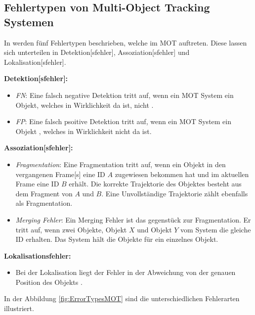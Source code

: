 \subsection{Fehlertypen von Multi-Object Tracking Systemen} \label{sec:MOT Fehlertypen}
In \cite{Leichter.2013} werden fünf Fehlertypen beschrieben, welche im \gls{MOT} auftreten. Diese lassen sich unterteilen in \gls{Detektion}[sfehler], \gls{Assoziation}[sfehler] und \gls{Lokalisation}[sfehler]. \par

\textbf{\gls{Detektion}[sfehler]:}
\begin{itemize}
    \item \textit{\gls{FN}}: Eine falsch negative \gls{Detektion} tritt auf, wenn ein \gls{MOT} System ein Objekt, welches in Wirklichkeit da ist, nicht .
    \item \textit{\gls{FP}}: Eine falsch psoitive \gls{Detektion} tritt auf, wenn ein \gls{MOT} System ein Objekt , welches in Wirklichkeit nicht da ist.
\end{itemize}

\textbf{\gls{Assoziation}[sfehler]:}
\begin{itemize}
    \item \textit{\gls{Fragmentation}}: Eine Fragmentation tritt auf, wenn ein Objekt in den vergangenen \gls{Frame}[s] eine \acrshort{ID} \(A\) zugewiesen bekommen hat und im aktuellen \gls{Frame} eine \acrshort{ID} \(B\) erhält. Die korrekte \gls{Trajektorie} des Objektes besteht aus dem Fragment von \(A\) und \(B\). Eine Unvollständige \gls{Trajektorie} zählt ebenfalls als Fragmentation. 
    \item \textit{\gls{Merging Fehler}}: Ein Merging Fehler ist das gegenstück zur Fragmentation. Er tritt auf, wenn zwei Objekte, Objekt \(X\) und Objekt \(Y\) vom System die gleiche \acrshort{ID} erhalten. Das System hält die Objekte für ein einzelnes Objekt. 
\end{itemize}

\textbf{\gls{Lokalisationsfehler}:}
\begin{itemize}
    \item Bei der \gls{Lokalisation} liegt der Fehler in der Abweichung von der genauen Position des Objekts \cite{Leichter.2013}. \par
\end{itemize}

In der Abbildung \ref{fig:ErrorTypesMOT} sind die unterschiedlichen Fehlerarten illustriert. 


